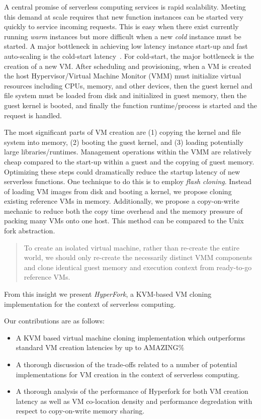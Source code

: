  A central promise of
serverless computing services is rapid scalability. Meeting this demand at
scale requires that new function instances can be started very quickly to
service incoming requests. This is easy when there exist currently running
\emph{warm} instances but more difficult when a new \emph{cold} instance must
be started. A major bottleneck in achieving low latency instance start-up and
fast auto-scaling is the cold-start latency~\cite{peeking}. For cold-start, the
major bottleneck is the creation of a new VM. After scheduling and
provisioning, when a VM is created the host Hypervisor/Virtual Machine Monitor
(VMM) must initialize virtual resources including CPUs, memory, and other
devices, then the guest kernel and file system must be loaded from disk and
initialized in guest memory, then the guest kernel is booted, and finally the
function runtime/process is started and the request is handled.

 The most significant parts of VM creation are (1)
copying the kernel and file system into memory, (2) booting the guest kernel,
and (3) loading potentially large libraries/runtimes. Management operations
within the VMM are relatively cheap compared to the start-up within a guest and
the copying of guest memory. Optimizing these steps could dramatically reduce
the startup latency of new serverless functions. One technique to do this is to
employ \emph{flash cloning}. Instead of loading VM images from disk and booting
a kernel, we propose cloning existing reference VMs in memory. Additionally, we
propose a copy-on-write mechanic to reduce both the copy time overhead and the
memory pressure of packing many VMs onto one host. This method can be compared
to the Unix fork abstraction.


\begin{quote} To create an isolated virtual machine, rather than re-create the
entire world, we should only re-create the necessarily distinct VMM components
and clone identical guest memory and execution context from ready-to-go
reference VMs.
\end{quote}

From this insight we present \emph{HyperFork}, a KVM-based VM cloning
implementation for the context of serverless computing.

 Our contributions are as follows: \begin{itemize}
\item A KVM based virtual machine cloning implementation which outperforms
standard VM creation latencies by up to AMAZING\%
\item A thorough discussion of the trade-offs related to a number of potential
implementations for VM creation in the context of serverless computing.
\item A thorough analysis of the performance of Hyperfork for both VM creation
latency as well as VM co-location density and performance degredation with
respect to copy-on-write memory sharing.
\end{itemize}

